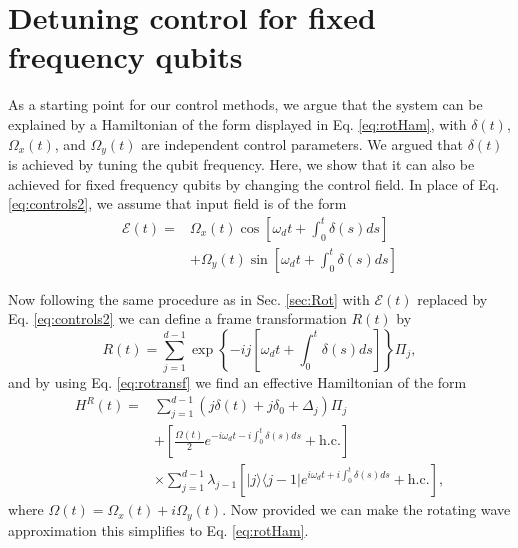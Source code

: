\documentclass[pra,twocolumn,floatfix,superscriptaddress,eqsecnum]{revtex4-1}
\newcommand{\bra}[1]{\langle{#1}|}
\newcommand{\ket}[1]{|{#1}\rangle}
\begin{document}
\section{Detuning control for fixed frequency qubits}\label{sec:det}

As a starting point for our control methods, we argue that the system can be explained by a Hamiltonian of the form displayed in Eq. \eqref{eq:rotHam}, with $\delta(t)$, $\Omega_x(t)$, and $\Omega_y(t)$ are independent control parameters. We argued that $\delta(t)$ is achieved by tuning the qubit frequency. Here, we show that it can also be achieved for fixed frequency qubits by changing the control field. In place of Eq. \eqref{eq:controls2}, we assume that input field is of the form
\begin{equation}\label{eq:controls2}
\begin{split}
\mathcal{E}(t)=&\Omega_x(t)\cos\left[\omega_d t + \int_0^t\delta(s)ds\right]\\&+\Omega_y(t)\sin\left[\omega_d t +\int_0^t\delta(s)ds\right]
\end{split}
\end{equation}

Now following the same procedure as in Sec. \ref{sec:Rot} with $\mathcal{E}(t)$ replaced by Eq. \eqref{eq:controls2} we can define a frame transformation $R(t)$
by
\begin{equation}
 R(t)=\sum_{j=1}^{d-1}\exp\left\{-i j\left[\omega_d t+ \int_0^t\delta(s)ds \right]\right\}\Pi_j,
\end{equation} and by using Eq. \eqref{eq:rotransf} we find an effective Hamiltonian of the form
\begin{equation}
 \begin{split}
H^R(t)=&\sum_{j=1}^{d-1}(j\delta(t)+j\delta_0+\Delta_j)\Pi_j\\& + \left[\frac{\Omega(t)}{2}e^{-i\omega_d t-i\int_0^t\delta(s)ds}+\mathrm{h.c.}\right]\\&\times\sum_{j=1}^{d-1}\lambda_{j-1}\left[\ket{j}\bra{j-1}e^{i\omega_d t+i\int_0^t\delta(s)ds}+\mathrm{h.c.}\right],\end{split}
\end{equation}  where $\Omega(t) = \Omega_x(t)+i\Omega_y(t)$. Now provided we can make the rotating wave approximation this simplifies to Eq. \eqref{eq:rotHam}.
\end{document}
